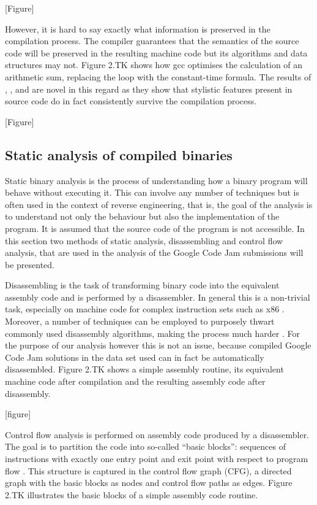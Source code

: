 \documentclass[a4paper,11pt]{kth-mag}
\begin{document}
[Figure]

However, it is hard to say exactly what information is preserved in the
compilation process. The compiler guarantees that the semantics of the source
code will be preserved in the resulting machine code but its algorithms and data
structures may not. Figure 2.TK shows how gcc optimises the calculation of an
arithmetic sum, replacing the loop with the constant-time formula. The results
of \parencite{rosenblum2011wrote}, \parencite{caliskan2015coding}, and
\parencite{alrabaee2014oba2} are novel in this regard as they show that
stylistic features present in source code do in fact consistently survive the
compilation process.

[Figure]
\subsection{Static analysis of compiled binaries} \label{static-analysis-tb}
Static binary analysis is the process of understanding how a binary program
will behave without executing it. This can involve any number of techniques
but is often used in the context of reverse engineering, that is, the goal of
the analysis is to understand not only the behaviour but also the
implementation of the program. It is assumed that the source code of the
program is not accessible. In this section two methods of static
analysis, disassembling and control flow analysis, that are used in the
analysis of the Google Code Jam submissions will be presented.

Disassembling is the task of transforming binary code into the equivalent
assembly code and is performed by a disassembler. In general this is a
non-trivial task, especially on machine code for complex instruction sets such
as x86 \parencite{wartell2011differentiating}. Moreover, a number of techniques
can be employed to purposely thwart commonly used disassembly algorithms,
making the process much harder \parencite{linn2003obfuscation}. For the purpose
of our analysis however this is not an issue, because
compiled Google Code Jam solutions in the data set used can in fact be automatically
disassembled. Figure 2.TK shows a simple assembly routine, its equivalent
machine code after compilation and the resulting assembly code after
disassembly.

[figure]

Control flow analysis is performed on assembly code produced by a disassembler.
The goal is to partition the code into so-called ``basic blocks'': sequences of
instructions with exactly one entry point and exit point with respect to
program flow \parencite{allen1970control}. This structure is captured in the
control flow graph (CFG), a directed graph with the basic blocks as nodes and
control flow paths as edges. Figure 2.TK illustrates the basic blocks of a
simple assembly code routine.
\end{document}
